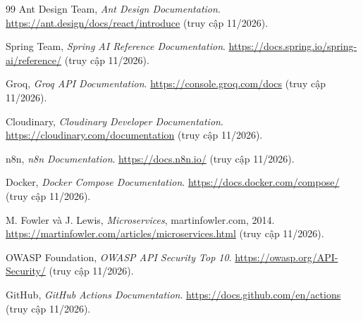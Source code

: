 \begin{thebibliography}{99}
Ant Design Team, \textit{Ant Design Documentation}.
\url{https://ant.design/docs/react/introduce} (truy cập 11/2026).

Spring Team, \textit{Spring AI Reference Documentation}.
\url{https://docs.spring.io/spring-ai/reference/} (truy cập 11/2026).

Groq, \textit{Groq API Documentation}.
\url{https://console.groq.com/docs} (truy cập 11/2026).

Cloudinary, \textit{Cloudinary Developer Documentation}.
\url{https://cloudinary.com/documentation} (truy cập 11/2026).

n8n, \textit{n8n Documentation}.
\url{https://docs.n8n.io/} (truy cập 11/2026).

Docker, \textit{Docker Compose Documentation}.
\url{https://docs.docker.com/compose/} (truy cập 11/2026).

M. Fowler và J. Lewis, \textit{Microservices}, martinfowler.com, 2014.
\url{https://martinfowler.com/articles/microservices.html} (truy cập 11/2026).

OWASP Foundation, \textit{OWASP API Security Top 10}.
\url{https://owasp.org/API-Security/} (truy cập 11/2026).

GitHub, \textit{GitHub Actions Documentation}.
\url{https://docs.github.com/en/actions} (truy cập 11/2026).

\end{thebibliography}
